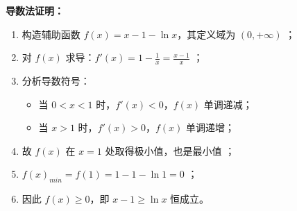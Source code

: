 \begin{proofbox}
\textbf{导数法证明：}
\begin{enumerate}
    \item 构造辅助函数 $f(x) = x - 1 - \ln x$，其定义域为 $(0, +\infty)$ ；
    \item 对 $f(x)$ 求导：$f'(x) = 1 - \frac{1}{x} = \frac{x-1}{x}$ ；
    \item 分析导数符号：
    \begin{itemize}
        \item 当 $0 < x < 1$ 时，$f'(x) < 0$，$f(x)$ 单调递减；
        \item 当 $x > 1$ 时，$f'(x) > 0$，$f(x)$ 单调递增；
    \end{itemize}
    \item 故 $f(x)$ 在 $x = 1$ 处取得极小值，也是最小值 ；
    \item $f(x)_{min} = f(1) = 1 - 1 - \ln 1 = 0$ ；
    \item 因此 $f(x) \geqslant 0$，即 $x - 1 \geqslant \ln x$ 恒成立。
\end{enumerate}
\end{proofbox}